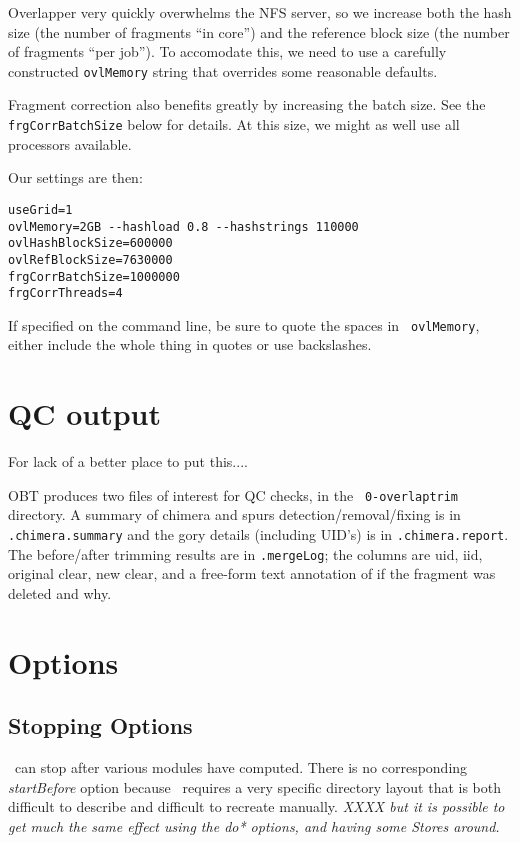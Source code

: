 \documentclass[twoside,11pt]{article}
\begin{document}
Overlapper very quickly overwhelms the NFS server, so we increase both
the hash size (the number of fragments ``in core'') and the reference
block size (the number of fragments ``per job'').  To accomodate this,
we need to use a carefully constructed {\tt ovlMemory} string that
overrides some reasonable defaults.

Fragment correction also benefits greatly by increasing the batch
size.  See the {\tt frgCorrBatchSize} below for details.  At this
size, we might as well use all processors available.

Our settings are then:

\begin{verbatim}
useGrid=1
ovlMemory=2GB --hashload 0.8 --hashstrings 110000
ovlHashBlockSize=600000
ovlRefBlockSize=7630000
frgCorrBatchSize=1000000
frgCorrThreads=4
\end{verbatim}

If specified on the command line, be sure to quote the spaces in {\tt
ovlMemory}, either include the whole thing in quotes or use backslashes.


\section{QC output}

For lack of a better place to put this....

OBT produces two files of interest for QC checks, in the {\tt
0-overlaptrim} directory.  A summary of chimera and spurs
detection/removal/fixing is in {\tt *.chimera.summary} and the gory
details (including UID's) is in {\tt *.chimera.report}.  The
before/after trimming results are in {\tt *.mergeLog}; the columns are
uid, iid, original clear, new clear, and a free-form text annotation
of if the fragment was deleted and why.



\section{Options}



\subsection{Stopping Options}
\label{sec:obtopts}

\runCA\ can stop after various modules have computed.  There is no
corresponding {\it startBefore} option because \runCA\ requires a very
specific directory layout that is both difficult to describe and
difficult to recreate manually.  {\em XXXX but it is possible to get
much the same effect using the {\it do*} options, and having some
Stores around.}
\end{document}
